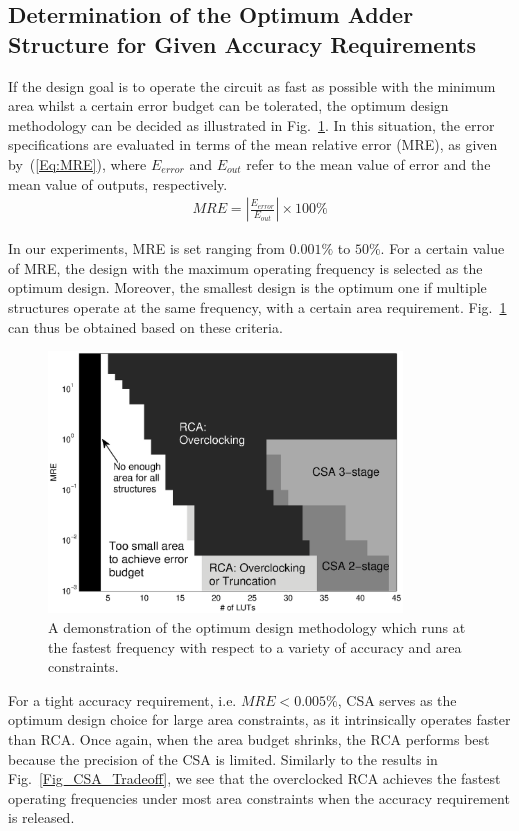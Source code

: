 \documentclass[prodmode,acmtrets]{acmsmall} %
\begin{document}
\subsection{Determination of the Optimum Adder Structure for Given Accuracy Requirements}
If the design goal is to operate the circuit as fast as possible with the minimum area whilst a certain error budget can be tolerated, the optimum design methodology can be decided as illustrated in Fig.~\ref{Fig_CSA_Tradeoff_Error}. In this situation, the error specifications are evaluated in terms of the mean relative error (MRE), as given by~(\ref{Eq:MRE}), where $E_{error}$ and $E_{out}$ refer to the mean value of error and the mean value of outputs, respectively.
%
\begin{eqnarray}\label{Eq:MRE}
  MRE=\left|\frac{E_{error}}{E_{out}}\right|\times 100\%
\end{eqnarray}

In our experiments, MRE is set ranging from $0.001\%$ to $50\%$. For a certain value of MRE, the design with the maximum operating frequency is selected as the optimum design. Moreover, the smallest design is the optimum one if multiple structures operate at the same frequency, with a certain area requirement. Fig.~\ref{Fig_CSA_Tradeoff_Error} can thus be obtained based on these criteria.
%
\begin{figure}[t]
    \centering
    \vspace{-2ex}
    \includegraphics[width=3.7in]{./Figures/Tradeoff_Error.eps}
    \vspace{-2ex}
    \caption{A demonstration of the optimum design methodology which runs at the fastest frequency with respect to a variety of accuracy and area constraints.}
    \label{Fig_CSA_Tradeoff_Error}
\end{figure}

For a tight accuracy requirement, i.e. $MRE<0.005\%$, CSA serves as the optimum design choice for large area constraints, as it intrinsically operates faster than RCA. Once again, when the area budget shrinks, the RCA performs best because the precision of the CSA is limited. Similarly to the results in Fig.~\ref{Fig_CSA_Tradeoff}, we see that the overclocked RCA achieves the fastest operating frequencies under most area constraints when the accuracy requirement is released.
\end{document}
